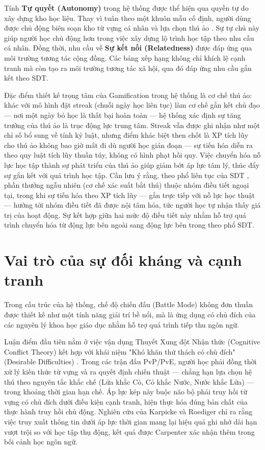 Tính \textbf{Tự quyết (Autonomy)} trong hệ thống được thể hiện qua quyền tự do xây dựng kho học liệu. Thay vì tuân theo một khuôn mẫu cố định, người dùng được chủ động biên soạn kho từ vựng cá nhân và lựa chọn thú ảo \cite{WerbachHunter2012}. Sự tự chủ này giúp người học chủ động hơn trong việc xây dựng lộ trình học tập theo nhu cầu cá nhân. Đồng thời, nhu cầu về \textbf{Sự kết nối (Relatedness)} được đáp ứng qua môi trường tương tác cộng đồng. Các bảng xếp hạng không chỉ khích lệ cạnh tranh mà còn tạo ra môi trường tương tác xã hội, qua đó đáp ứng nhu cầu gắn kết theo SDT.

Đặc điểm thiết kế trọng tâm của Gamification trong hệ thống là cơ chế thú ảo: khác với mô hình đặt streak (chuỗi ngày học liên tục) làm cơ chế gắn kết chủ đạo --- nơi một ngày bỏ học là thất bại hoàn toàn --- hệ thống xác định sự tăng trưởng của thú ảo là trục động lực trung tâm. Streak vẫn được ghi nhận như một chỉ số bổ sung về tính kỷ luật, nhưng điểm khác biệt then chốt là XP tích lũy cho thú ảo không bao giờ mất đi dù người học gián đoạn --- sự tiến hóa diễn ra theo quy luật tích lũy thuần túy, không có hình phạt hồi quy. Việc chuyển hóa nỗ lực học tập thành sự phát triển của thú ảo giúp giảm bớt áp lực tâm lý, thúc đẩy sự gắn kết với quá trình học tập. Cần lưu ý rằng, theo phổ liên tục của SDT \cite{RyanDeci2017}, phần thưởng ngẫu nhiên (cơ chế xác suất bắt thú) thuộc nhóm điều tiết ngoại tại, trong khi sự tiến hóa theo XP tích lũy --- gắn trực tiếp với nỗ lực học thuật --- hướng tới nhóm điều tiết đã được nội tâm hóa, tức người học tự nhận thấy giá trị của hoạt động. Sự kết hợp giữa hai mức độ điều tiết này nhằm hỗ trợ quá trình chuyển hóa từ động lực bên ngoài sang động lực bên trong theo phổ SDT.

\section{Vai trò của sự đối kháng và cạnh tranh}

Trong cấu trúc của hệ thống, chế độ chiến đấu (Battle Mode) không đơn thuần được thiết kế như một tính năng giải trí bề nổi, mà là ứng dụng có chủ đích của các nguyên lý khoa học giáo dục nhằm hỗ trợ quá trình tiếp thu ngôn ngữ.

Luận điểm đầu tiên nằm ở việc vận dụng Thuyết Xung đột Nhận thức (Cognitive Conflict Theory) \cite{Limon2001} kết hợp với khái niệm "Khó khăn thử thách có chủ đích" (Desirable Difficulties) \cite{Bjork2011}. Trong các trận đấu PvP/PvE, người học phải đồng thời xử lý kiến thức từ vựng và ra quyết định chiến thuật — chẳng hạn lựa chọn hệ thú theo nguyên tắc khắc chế (Lửa khắc Cỏ, Cỏ khắc Nước, Nước khắc Lửa) — trong khoảng thời gian hạn chế. Áp lực kép này buộc não bộ phải truy hồi từ vựng có chủ đích dưới điều kiện cạnh tranh, hiện thực hóa đúng bản chất của thực hành truy hồi chủ động. Nghiên cứu của Karpicke và Roediger \cite{Karpicke2008} chỉ ra rằng việc truy xuất thông tin dưới áp lực thời gian mang lại hiệu quả ghi nhớ dài hạn vượt trội so với học tập thụ động, kết quả được Carpenter \cite{Carpenter2012} xác nhận thêm trong bối cảnh học ngôn ngữ.


